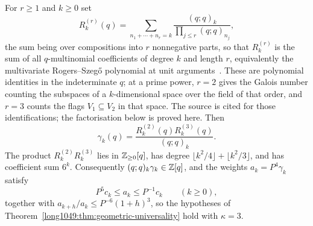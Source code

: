 \documentclass[11pt]{article}
\begin{document}
\begin{proposition}
\label{long1049:prop:rogers-factorisation}
For $r\ge1$ and $k\ge0$ set
\[
 R_k^{(r)}(q)=\sum_{n_1+\cdots+n_r=k}
 \frac{(q;q)_k}{\prod_{j\le r}(q;q)_{n_j}},
\]
the sum being over compositions into $r$ nonnegative parts, so that
$R_k^{(r)}$ is the sum of all $q$-multinomial coefficients of degree $k$ and
length $r$, equivalently the multivariate Rogers--Szeg\H{o} polynomial at unit
arguments~\cite{vinroot2010}. These are polynomial identities in the
indeterminate $q$; at a prime power, $r=2$ gives the Galois number counting
the subspaces of a $k$-dimensional space over the field of that order, and
$r=3$ counts the flags $V_1\subseteq V_2$ in that space. The source is cited
for those identifications; the factorisation below is proved here. Then
\[
 \gamma_k(q)=\frac{R_k^{(2)}(q)R_k^{(3)}(q)}{(q;q)_k}.
\]
The product $R_k^{(2)}R_k^{(3)}$ lies in $\mathbb{Z}_{\ge0}[q]$, has degree
$\lfloor k^2/4\rfloor+\lfloor k^2/3\rfloor$, and has coefficient sum $6^k$.
Consequently $(q;q)_k\gamma_k\in\mathbb{Z}[q]$, and the weights
$a_k=P^4\gamma_k$ satisfy
\[
 P^5c_k\le a_k\le P^{-1}c_k
 \qquad(k\ge0),
\]
together with $a_{k+h}/a_k\le P^{-6}(1+h)^3$, so the hypotheses of
Theorem~\ref{long1049:thm:geometric-universality} hold with $\kappa=3$.
\end{proposition}
\end{document}
